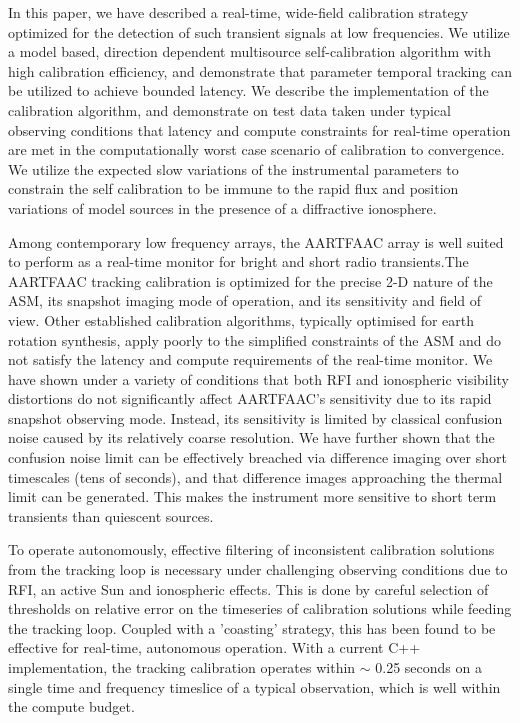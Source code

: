 \documentclass{aa}
\begin{document}
In this  paper, we have  described a real-time, wide-field  calibration strategy
optimized for  the detection of such  transient signals at  low frequencies.  We
utilize  a   model  based,  direction   dependent  multisource  self-calibration
algorithm  with  high calibration  efficiency,  and  demonstrate that  parameter
temporal tracking can  be utilized to achieve bounded  latency.  We describe the
implementation of the calibration algorithm,  and demonstrate on test data taken
under  typical observing  conditions that  latency and  compute  constraints for
real-time  operation are  met  in  the computationally  worst  case scenario  of
calibration  to convergence.   We utilize  the expected  slow variations  of the
instrumental parameters  to constrain the self  calibration to be  immune to the
rapid  flux and  position  variations of  model  sources in  the  presence of  a
diffractive ionosphere.

Among  contemporary low  frequency  arrays, the  \mbox{AARTFAAC}  array is  well
suited  to  perform   as  a  real-time  monitor  for   bright  and  short  radio
transients.The \mbox{AARTFAAC} tracking calibration is optimized for the precise
2-D  nature  of  the ASM,  its  snapshot  imaging  mode  of operation,  and  its
sensitivity  and  field  of  view.  Other  established  calibration  algorithms,
typically optimised for earth rotation synthesis, apply poorly to the simplified
constraints of the  ASM and do not satisfy the  latency and compute requirements
of the real-time monitor.  We have shown under a variety of conditions that both
RFI  and   ionospheric  visibility  distortions  do   not  significantly  affect
\mbox{AARTFAAC's}  sensitivity  due  to   its  rapid  snapshot  observing  mode.
Instead, its sensitivity  is limited by classical confusion  noise caused by its
relatively coarse  resolution.  We have  further shown that the  confusion noise
limit can be  effectively breached via difference imaging  over short timescales
(tens of seconds), and that  difference images approaching the thermal limit can
be generated. This makes the  instrument more sensitive to short term transients
than quiescent sources.

To  operate  autonomously,   effective  filtering  of  inconsistent  calibration
solutions  from  the tracking  loop  is  necessary  under challenging  observing
conditions due to  RFI, an active Sun and ionospheric effects.   This is done by
careful  selection  of  thresholds  on  relative  error  on  the  timeseries  of
calibration solutions while feeding the tracking loop. Coupled with a 'coasting'
strategy,  this  has  been  found  to be  effective  for  real-time,  autonomous
operation. With a current  C++ implementation, the tracking calibration operates
within $\sim$ 0.25 seconds on a single time and frequency timeslice of a typical
observation, which is well within the compute budget.
\end{document}
